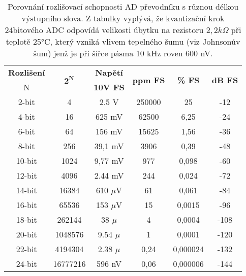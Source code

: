         \begin{table*}[ht!]
           \centering
            \setlength{\tabcolsep}{5pt}
            \begin{tabular}{|c|c|c|c|c|c|}
              \hline
                \textbf{Rozlišení} & \multirow{2}{*}{$\mathbf{2^N}$} &  \textbf{Napětí} & 
                \multirow{2}{*}{\textbf{ppm FS}}& \multirow{2}{*}{\textbf{\% FS}}&   
                \multirow{2}{*}{\textbf{dB FS}}                                                 \\
                         N     &           &  \textbf{10V FS} &        &             &          \\
              \hline
                       2-bit   &         4 &            2.5 V & 250000 &          25 &  -12     \\
              \hline
                       4-bit   &        16 &           625 mV &  62500 &        6,25 &  -24     \\
              \hline
                       6-bit   &        64 &           156 mV &  15625 &        1,56 &  -36     \\
              \hline
                       8-bit   &       256 &          39,1 mV &   3906 &        0,39 &  -48     \\
              \hline
                      10-bit   &      1024 &          9,77 mV &    977 &       0,098 &  -60     \\
              \hline
                      12-bit   &      4096 &          2.44 mV &    244 &       0,024 &  -72     \\
              \hline
                      14-bit   &     16384 &       610 $\mu$V &     61 &       0,061 &  -84     \\
              \hline
                      16-bit   &     65536 &       153 $\mu$V &     15 &      0,0015 &  -96     \\
              \hline
                      18-bit   &    262144 &         38 $\mu$ &      4 &      0,0004 & -108     \\
              \hline
                      20-bit   &   1048576 &       9.54 $\mu$ &      1 &      0,0001 & -120     \\
              \hline
                      22-bit   &   4194304 &       2.38 $\mu$ &   0,24 &    0,000024 & -132     \\
              \hline
                      24-bit   &  16777216 &           596 nV &   0,06 &    0,000006 & -144     \\
              \hline
           \end{tabular}
           \caption[Kvantizace: Velikost LSB]{Porovnání rozlišovací schopnosti AD převodníku s  
                    různou délkou výstupního slova. Z tabulky vyplývá, že kvantizační krok 
                    24bitového ADC odpovídá velikosti úbytku na rezistoru $2,2 k\Omega$ při teplotě 
                    25°C, který vzniká vlivem tepelného šumu (viz Johnsonův šum) jenž je při šířce 
                    pásma 10 kHz roven 600 nV. }
           \label{AES:tab_10b_ADC_resolution}
         \end{table*}

